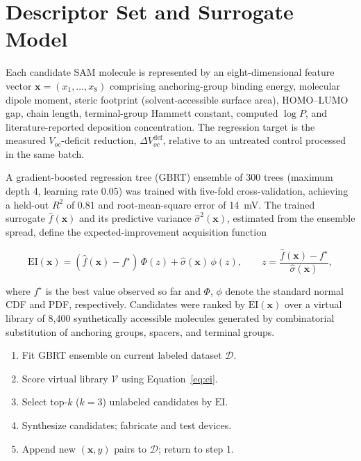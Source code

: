 \section{Descriptor Set and Surrogate Model}

Each candidate SAM molecule is represented by an eight-dimensional feature
vector $\mathbf{x} = (x_1,\ldots,x_8)$ comprising anchoring-group binding
energy, molecular dipole moment, steric footprint (solvent-accessible
surface area), HOMO--LUMO gap, chain length, terminal-group Hammett
constant, computed $\log P$, and literature-reported deposition
concentration. The regression target is the measured $V_{oc}$-deficit
reduction, $\Delta V_{oc}^{\text{def}}$, relative to an untreated control
processed in the same batch.

A gradient-boosted regression tree (GBRT) ensemble of 300 trees (maximum
depth 4, learning rate 0.05) was trained with five-fold cross-validation,
achieving a held-out $R^2$ of 0.81 and root-mean-square error of 14~mV.
The trained surrogate $\hat{f}(\mathbf{x})$ and its predictive variance
$\hat{\sigma}^2(\mathbf{x})$, estimated from the ensemble spread, define
the expected-improvement acquisition function

\begin{equation}
\mathrm{EI}(\mathbf{x}) = \left(\hat{f}(\mathbf{x}) - f^{\star}\right)\,
\Phi(z) + \hat{\sigma}(\mathbf{x})\,\phi(z), \qquad
z = \frac{\hat{f}(\mathbf{x}) - f^{\star}}{\hat{\sigma}(\mathbf{x})},
\label{eq:ei}
\end{equation}

where $f^{\star}$ is the best value observed so far and $\Phi$, $\phi$
denote the standard normal CDF and PDF, respectively. Candidates were
ranked by $\mathrm{EI}(\mathbf{x})$ over a virtual library of 8{,}400
synthetically accessible molecules generated by combinatorial substitution
of anchoring groups, spacers, and terminal groups.

\begin{keybox}[title=Algorithm 3.1 --- Closed-Loop Candidate Selection]
\begin{enumerate}[leftmargin=*, itemsep=2pt]
\item Fit GBRT ensemble on current labeled dataset $\mathcal{D}$.
\item Score virtual library $\mathcal{V}$ using Equation~\eqref{eq:ei}.
\item Select top-$k$ ($k=3$) unlabeled candidates by $\mathrm{EI}$.
\item Synthesize candidates; fabricate and test devices.
\item Append new $(\mathbf{x}, y)$ pairs to $\mathcal{D}$; return to step 1.
\end{enumerate}
\end{keybox}
